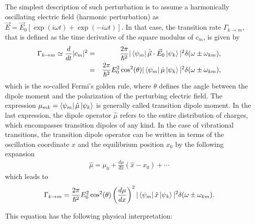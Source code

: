 The simplest description of such perturbation is to assume a harmonically oscillating electric field (harmonic perturbation) as $\vec{E} = \vec{E}_0 [\exp(i \omega t) + \exp(-i \omega t)]$. In that case, the transition rate $\Gamma_{k \to m}$, that is defined as the time derivative of the square modulus of $c_m$, is given by 
\begin{eqnarray}
\Gamma_{k \to m} \simeq \frac{d}{d t} | c_m |^2 &=& \frac{2 \pi}{ \hslash^2} |   \bra{\psi_m} \hat{\vec{\mu}} \cdot \vec{E}_0 \ket{\psi_k}   |^2 \delta(  \omega \pm \omega_{km}), \nonumber \\
&=& \frac{2 \pi}{ \hslash^2} E_0^2 \cos^2 (\theta) |   \bra{\psi_m} \hat{\mu}  \ket{\psi_k}   |^2  \delta(\omega \pm \omega_{km} ),
\label{TransRate}
\end{eqnarray}
which is the so-called Fermi's golden rule, where $\theta$ defines the angle between the dipole moment and the polarization of the perturbing electric field. The expression $ \mu_{mk} = \bra{\psi_m} \hat{\mu}  \ket{\psi_k}$ is generally called transition dipole moment. In the last expression, the dipole operator $\hat{\mu}$ refers to the entire distribution of charges, which encompasses transition dipoles of any kind. In the case of vibrational transitions, the transition dipole operator can be written in terms of the oscillation coordinate $x$ and the equilibrium position $x_0$ by the following expansion
\begin{eqnarray}
\hat{\mu} = {\mu}_0 + \frac{d {\mu}}{ d x} (\hat{x} - {x}_0) + \cdots
\end{eqnarray}
which leads to 
\begin{eqnarray}
\Gamma_{k \to m} = \frac{2 \pi}{ \hslash^2} E_0^2 \cos^2 (\theta) \left( \frac{d \mu}{d x}   \right)^2 |   \bra{\psi_m} \hat{x}  \ket{\psi_k}   |^2  \delta(\omega \pm \omega_{km} ).
\label{TransRateFinal}
\end{eqnarray}

This equation has the following physical interpretation: 

